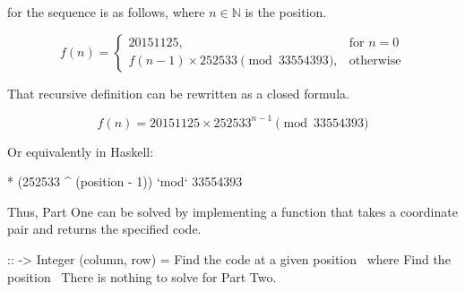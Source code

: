  for the sequence is as follows, where $n
\in \mathbb{N}$ is the position.

\begin{equation}
  f(n) =
  \begin{cases}
    20151125, & \text{for } n=0 \\
    f(n - 1) \times 252533 \pmod{33554393}, & \text{otherwise}
  \end{cases}
\end{equation}

That recursive definition can be rewritten as a closed formula.

\begin{equation}
  f(n) = 20151125 \times 252533^{n-1} \pmod{33554393}
\end{equation}

Or equivalently in Haskell:

\nwenddocs{}\endmoddef\nwstartdeflinemarkup{} * (252533 ^ (position - 1)) `mod` 33554393
\nwendcode{}\nwdocspar

Thus, Part One can be solved by implementing a function that takes a coordinate
pair and returns the specified code.

\nwenddocs{}\endmoddef\nwstartdeflinemarkup{}\nwenddeflinemarkup
{} ::  -> Integer
 (column, row) = \LA{}Find the code at a given position~{\nwtagstyle{}}\RA{}
  where
    \LA{}Find the position~{\nwtagstyle{}}\RA{}
\eatline
{}\nwendcode{}\nwdocspar
There is nothing to solve for Part Two.

